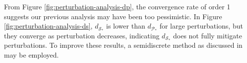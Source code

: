From Figure \ref{fig:perturbation-analysis-dp}, the convergence rate of order 1 suggests our previous analysis may have been too pessimistic. In Figure \ref{fig:perturbation-analysis-ds}, \(d_{\mathcal{S}_*}\) is lower than \(d_{\mathcal{P}_*}\) for large perturbations, but they converge as perturbation decreases, indicating \(d_{\mathcal{S}_*}\) does not fully mitigate perturbations. To improve these results, a semidiscrete method as discussed in \cite{woienSemiDiscretizedMethodOptimal2019} may be employed.